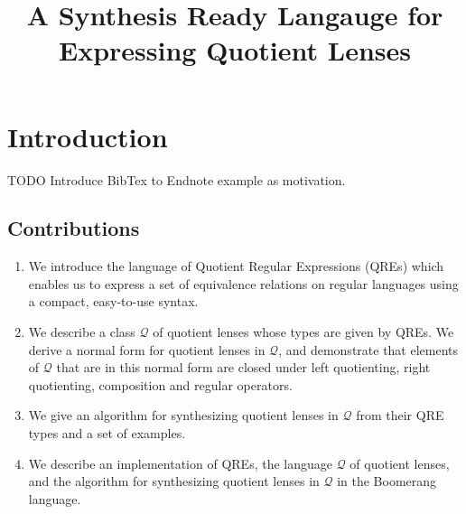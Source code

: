 \documentclass{svproc}
\begin{document}
\mainmatter              %
%
\title{A Synthesis Ready Langauge for Expressing Quotient Lenses}
%
\titlerunning{}  %
%
\author{}
%
\authorrunning{} %
%
\tocauthor{}
%
\institute{}

\maketitle              %

\begin{abstract}

\end{abstract}

\section{Introduction}
TODO Introduce BibTex to Endnote example as motivation.
\subsection{Contributions}
\begin{enumerate}
  \item
  We introduce the language of Quotient Regular Expressions (QREs) which enables
  us to express a set of equivalence relations on regular languages using a
  compact, easy-to-use syntax.
  \item
  We describe a class $\mathcal{Q}$ of quotient lenses whose types are given by
  QREs. We derive a normal form for quotient lenses in $\mathcal{Q}$, and
  demonstrate that elements of $\mathcal{Q}$ that are in this normal form are
  closed under left quotienting, right quotienting, composition and regular
  operators.
  \item
  We give an algorithm for synthesizing quotient lenses in
  $\mathcal{Q}$ from their QRE types and a set of examples.
  \item
  We describe an implementation of QREs, the language $\mathcal{Q}$ of quotient
  lenses, and the algorithm for synthesizing quotient lenses in $\mathcal{Q}$ in
  the Boomerang language.
\end{enumerate}
\end{document}
